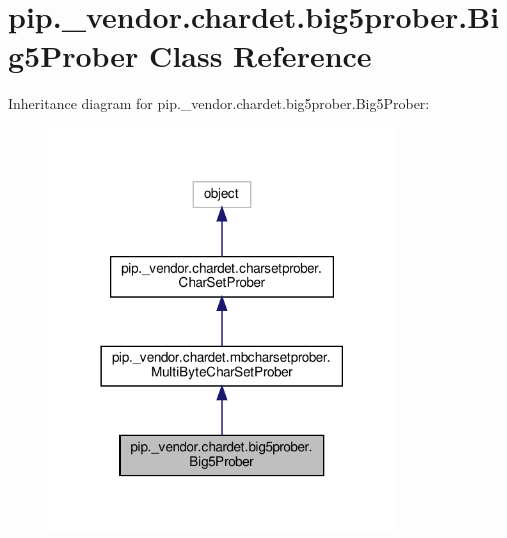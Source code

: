 \hypertarget{classpip_1_1__vendor_1_1chardet_1_1big5prober_1_1Big5Prober}{}\section{pip.\+\_\+vendor.\+chardet.\+big5prober.\+Big5\+Prober Class Reference}
\label{classpip_1_1__vendor_1_1chardet_1_1big5prober_1_1Big5Prober}


Inheritance diagram for pip.\+\_\+vendor.\+chardet.\+big5prober.\+Big5\+Prober\+:
\nopagebreak
\begin{figure}[H]
\begin{center}
\leavevmode
\includegraphics[width=261pt]{classpip_1_1__vendor_1_1chardet_1_1big5prober_1_1Big5Prober__inherit__graph}
\end{center}
\end{figure}


